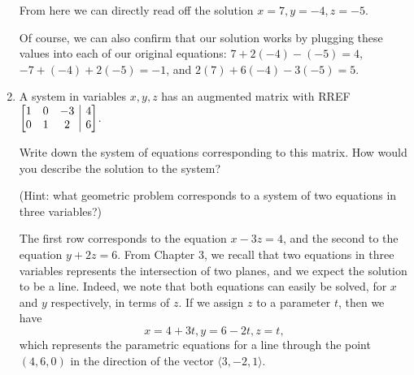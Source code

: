 \documentclass[12pt]{article}
\makeatletter
\newenvironment{amatrix}[1]{%
  \left[\begin{array}{@{}*{#1}{c}|c@{}}
}{%
  \end{array}\right]
}
\newcommand{\di}{\displaystyle}
\newcommand{\bam}{\begin{amatrix}}
\newcommand{\eam}{\end{amatrix}}
\makeatother
\begin{document}
\begin{enumerate}
From here we can directly read off the solution $x=7, y=-4, z=-5$.

Of course, we can also confirm that our solution works by plugging these values into each of our original equations: $7+2(-4)-(-5)=4$, $-7+(-4)+2(-5)=-1$, and $2(7)+6(-4)-3(-5) = 5$.

\bigskip


\item A system in variables $x,y,z$ has an augmented matrix with RREF $\di \bam{3} 1&0&-3&4\\0&1&2&6\eam$.

Write down the system of equations corresponding to this matrix. How would you describe the solution to the system?

(Hint: what geometric problem corresponds to a system of two equations in three variables?)

The first row corresponds to the equation $x-3z=4$, and the second to the equation $y+2z=6$. From Chapter 3, we recall that two equations in three variables represents the intersection of two planes, and we expect the solution to be a line. Indeed, we note that both equations can easily be solved, for $x$ and $y$ respectively, in terms of $z$. If we assign $z$ to a parameter $t$, then we have
\[
x=4+3t, y=6-2t, z=t,
\]
which represents the parametric equations for a line through the point $(4,6,0)$ in the direction of the vector $\langle 3,-2,1\rangle$.

 \end{enumerate}
 
\end{document}
